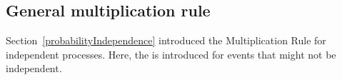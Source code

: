 \subsection{General multiplication rule}

Section~\ref{probabilityIndependence} introduced the Multiplication Rule for independent processes. Here, the  is introduced for events that might not be independent.

